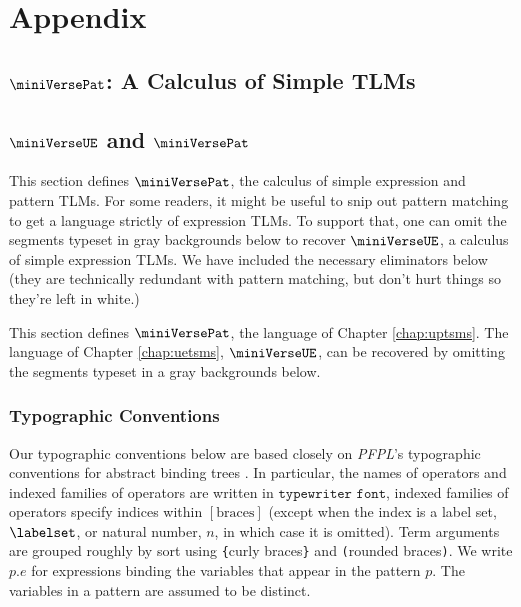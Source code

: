 \ificfp\else \part*{Appendix} \fi

\ificfp
\chapter{\texorpdfstring{$\miniVersePat$: A Calculus of Simple TLMs}{A Calculus of Simple TLMs}}
\else
\chapter{\texorpdfstring{$\miniVerseUE$ and $\miniVersePat$}{miniVerseSE and miniVerseS}}
\fi
\label{appendix:miniVerseSES}

\ificfp
This section defines $\miniVersePat$, the calculus of simple expression and pattern TLMs. For some readers, it might be useful to snip out pattern matching to get a language strictly of expression TLMs. To support that, one can omit the segments typeset in gray backgrounds below to recover $\miniVerseUE$, a calculus of simple expression TLMs. We have included the necessary eliminators below (they are technically redundant with pattern matching, but don't hurt things so they're left in white.)
\else

This section defines $\miniVersePat$, the language of Chapter \ref{chap:uptsms}. The language of Chapter \ref{chap:uetsms}, $\miniVerseUE$, can be recovered by omitting the segments typeset in a gray backgrounds below.
\fi

\clearpage

\section{Typographic Conventions}\label{appendix:typographic-conventions}
Our typographic conventions below are based closely on \emph{PFPL}'s typographic conventions for abstract binding trees \cite{pfpl}. In particular, the names of operators and indexed families of operators are written in $\texttt{typewriter font}$, indexed families of operators specify indices within $[\text{braces}]$ (except when the index is a label set, $\labelset$, or natural number, $n$, in which case it is omitted). Term arguments are grouped roughly by sort using \texttt{\{}curly braces\texttt{\}} and \texttt{(}rounded braces\texttt{)}. We write $p.e$ for expressions binding the variables that appear in the pattern $p$. The variables in a pattern are assumed to be distinct. 

